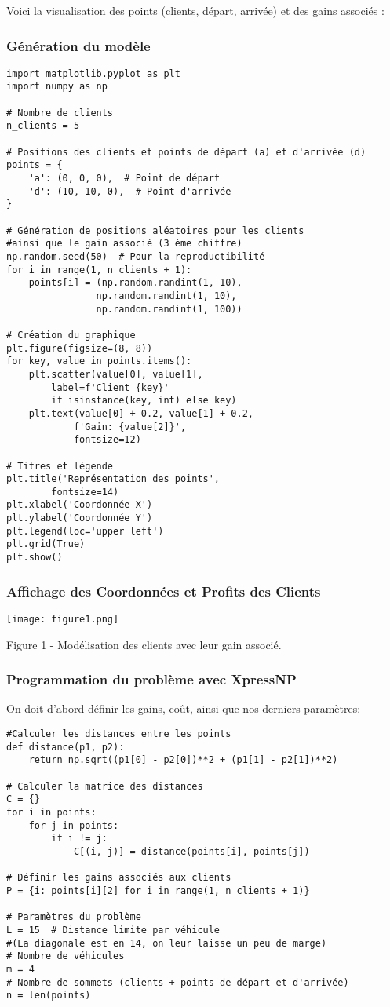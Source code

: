 \documentclass[a4paper, 12pt, DIV=12]{scrartcl}
\begin{document}
Voici la visualisation des points (clients, départ, arrivée) et des gains associés :
\subsubsection{Génération du modèle}
\begin{verbatim}
import matplotlib.pyplot as plt
import numpy as np

# Nombre de clients
n_clients = 5

# Positions des clients et points de départ (a) et d'arrivée (d)
points = {
    'a': (0, 0, 0),  # Point de départ
    'd': (10, 10, 0),  # Point d'arrivée
}

# Génération de positions aléatoires pour les clients
#ainsi que le gain associé (3 ème chiffre)
np.random.seed(50)  # Pour la reproductibilité
for i in range(1, n_clients + 1):
    points[i] = (np.random.randint(1, 10), 
                np.random.randint(1, 10), 
                np.random.randint(1, 100))

# Création du graphique
plt.figure(figsize=(8, 8))
for key, value in points.items():
    plt.scatter(value[0], value[1], 
        label=f'Client {key}' 
        if isinstance(key, int) else key)
    plt.text(value[0] + 0.2, value[1] + 0.2, 
            f'Gain: {value[2]}', 
            fontsize=12)

# Titres et légende
plt.title('Représentation des points', 
        fontsize=14)
plt.xlabel('Coordonnée X')
plt.ylabel('Coordonnée Y')
plt.legend(loc='upper left')
plt.grid(True)
plt.show()
\end{verbatim} 
\subsubsection{Affichage des Coordonnées et Profits des Clients}
\centering
\texttt{[image: figure1.png]}
\begin{center}
Figure 1 - Modélisation des clients avec leur gain associé.
\end{center}
\newpage
\subsubsection{Programmation du problème avec XpressNP}
On doit d'abord définir les gains, coût, ainsi que nos derniers paramètres:
\begin{verbatim}
#Calculer les distances entre les points
def distance(p1, p2):
    return np.sqrt((p1[0] - p2[0])**2 + (p1[1] - p2[1])**2)

# Calculer la matrice des distances
C = {}
for i in points:
    for j in points:
        if i != j:
            C[(i, j)] = distance(points[i], points[j])

# Définir les gains associés aux clients
P = {i: points[i][2] for i in range(1, n_clients + 1)}

# Paramètres du problème
L = 15  # Distance limite par véhicule 
#(La diagonale est en 14, on leur laisse un peu de marge)
# Nombre de véhicules
m = 4  
# Nombre de sommets (clients + points de départ et d'arrivée)
n = len(points)  

\end{verbatim}
\end{document}
